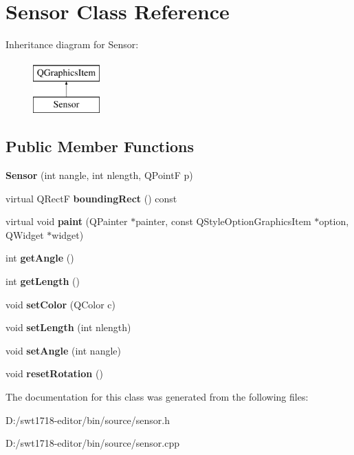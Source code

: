 \hypertarget{class_sensor}{}\section{Sensor Class Reference}
\label{class_sensor}
Inheritance diagram for Sensor\+:\begin{figure}[H]
\begin{center}
\leavevmode
\includegraphics[height=2.000000cm]{class_sensor}
\end{center}
\end{figure}
\subsection*{Public Member Functions}
\begin{DoxyCompactItemize}
\item 
\mbox{\label{class_sensor_a71e724fc8e79caa6b30532a51562113a}} 
{\bfseries Sensor} (int nangle, int nlength, Q\+PointF p)
\item 
\mbox{\label{class_sensor_a50ae976cd9319902385aa762f4249ed7}} 
virtual Q\+RectF {\bfseries bounding\+Rect} () const
\item 
\mbox{\label{class_sensor_a8f9855fbd3fa69c00c0065aa3d1bdc45}} 
virtual void {\bfseries paint} (Q\+Painter $\ast$painter, const Q\+Style\+Option\+Graphics\+Item $\ast$option, Q\+Widget $\ast$widget)
\item 
\mbox{\label{class_sensor_ab8b342c87c06018a244c835876d9fe85}} 
int {\bfseries get\+Angle} ()
\item 
\mbox{\label{class_sensor_a460531f1ab73104c15ad8975d961cdac}} 
int {\bfseries get\+Length} ()
\item 
\mbox{\label{class_sensor_af1a08c6f7a5b84cf96bd2e0bbe5c25cf}} 
void {\bfseries set\+Color} (Q\+Color c)
\item 
\mbox{\label{class_sensor_a623f89bd32e060295f338bf83c03ffaf}} 
void {\bfseries set\+Length} (int nlength)
\item 
\mbox{\label{class_sensor_a15e923daca628cd14d77c102e19ca523}} 
void {\bfseries set\+Angle} (int nangle)
\item 
\mbox{\label{class_sensor_a202df6c7c51ea7382cf3bcf07c7c2a0b}} 
void {\bfseries reset\+Rotation} ()
\end{DoxyCompactItemize}


The documentation for this class was generated from the following files\+:\begin{DoxyCompactItemize}
\item 
D\+:/swt1718-\/editor/bin/source/sensor.\+h\item 
D\+:/swt1718-\/editor/bin/source/sensor.\+cpp\end{DoxyCompactItemize}
